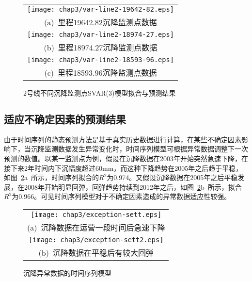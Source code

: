 \begin{figure}[htbp] 
    \centering 
    \begin{tabular}{c} 
        \texttt{[image: chap3/var-line2-19642-82.eps]} \\ 
        (a)~里程19642.82沉降监测点数据 \\
        \texttt{[image: chap3/var-line2-18974-27.eps]} \\ 
        (b)~里程18974.27沉降监测点数据 \\
        \texttt{[image: chap3/var-line2-18593-96.eps]} \\ 
        (c)~里程18593.96沉降监测点数据 \\
    \end{tabular}
    \caption{2号线不同沉降监测点SVAR(3)模型拟合与预测结果} 
    \label{fig:2号线不同沉降监测点SVAR3模型拟合与预测结果} 
\end{figure}

\subsection{适应不确定因素的预测结果}

由于时间序列的静态预测方法是基于真实历史数据进行计算，在某些不确定因素影响下，当沉降监测数据发生异常变化时，时间序列模型可根据异常数据调整下一次预测的数值。以某一监测点为例，假设在沉降数据在2003年开始突然急速下降，在接下来2年时间内下沉幅度超过60mm，而这种下降趋势在2005年之后趋于平稳，如图~\ref{fig:沉降异常数据的时间序列模型}a~所示，时间序列拟合的$R^2$为0.974。又假设沉降数据在2005年之后平稳发展，在2008年开始明显回弹，回弹趋势持续到2012年之后，如图~\ref{fig:沉降异常数据的时间序列模型}b~所示，拟合$R^2$为0.966。可见时间序列模型对于不确定因素造成的异常数据适应性较强。

\begin{figure}[htbp] 
    \centering 
    \begin{tabular}{c} 
        \texttt{[image: chap3/exception-sett.eps]} \\ 
        (a)~沉降数据在运营一段时间后急速下降 \\
        \texttt{[image: chap3/exception-sett2.eps]} \\ 
        (b)~沉降数据在平稳后有较大回弹 \\
    \end{tabular}
    \caption{沉降异常数据的时间序列模型} 
    \label{fig:沉降异常数据的时间序列模型} 
\end{figure}

